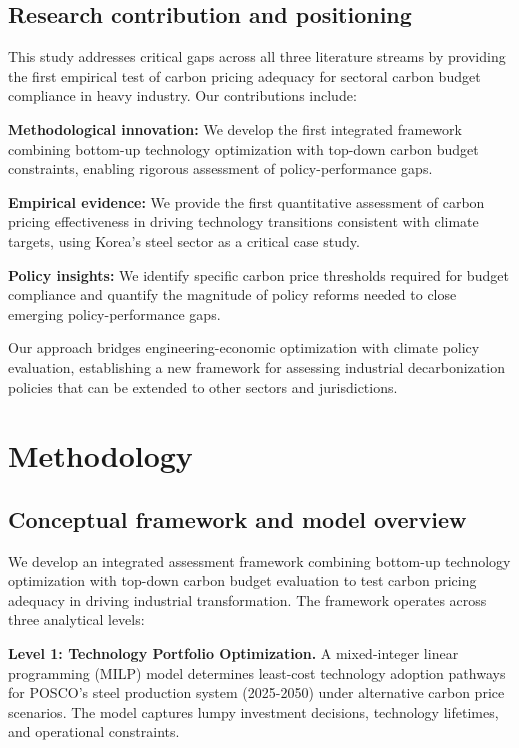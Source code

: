 \documentclass[preprint,1p,authoryear]{elsarticle}
\begin{document}
\subsection{Research contribution and positioning}

This study addresses critical gaps across all three literature streams by providing the first empirical test of carbon pricing adequacy for sectoral carbon budget compliance in heavy industry. Our contributions include:

\textbf{Methodological innovation:} We develop the first integrated framework combining bottom-up technology optimization with top-down carbon budget constraints, enabling rigorous assessment of policy-performance gaps.

\textbf{Empirical evidence:} We provide the first quantitative assessment of carbon pricing effectiveness in driving technology transitions consistent with climate targets, using Korea's steel sector as a critical case study.

\textbf{Policy insights:} We identify specific carbon price thresholds required for budget compliance and quantify the magnitude of policy reforms needed to close emerging policy-performance gaps.

Our approach bridges engineering-economic optimization with climate policy evaluation, establishing a new framework for assessing industrial decarbonization policies that can be extended to other sectors and jurisdictions.

\section{Methodology}

\subsection{Conceptual framework and model overview}

We develop an integrated assessment framework combining bottom-up technology optimization with top-down carbon budget evaluation to test carbon pricing adequacy in driving industrial transformation. The framework operates across three analytical levels:

\textbf{Level 1: Technology Portfolio Optimization.} A mixed-integer linear programming (MILP) model determines least-cost technology adoption pathways for POSCO's steel production system (2025-2050) under alternative carbon price scenarios. The model captures lumpy investment decisions, technology lifetimes, and operational constraints.
\end{document}
